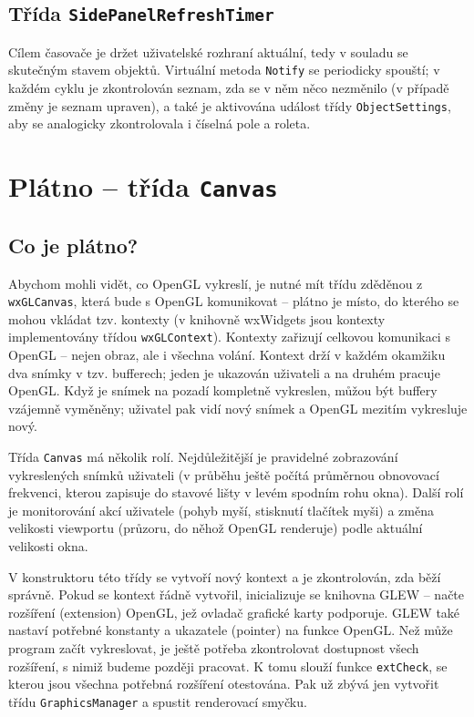 \documentclass[a4paper, 11pt]{report}
\begin{document}
\subsection{Třída \texttt{SidePanelRefreshTimer}}
Cílem časovače je držet uživatelské rozhraní aktuální, tedy v souladu se skutečným stavem objektů. Virtuální metoda \texttt{Notify} se periodicky spouští; v každém cyklu je zkontrolován seznam, zda se v něm něco nezměnilo (v případě změny je seznam upraven), a také je aktivována událost třídy \texttt{ObjectSettings}, aby se analogicky zkontrolovala i číselná pole a roleta.

\section{Plátno -- třída \texttt{Canvas}}
\subsection{Co je plátno?}
Abychom mohli vidět, co OpenGL vykreslí, je nutné mít třídu zděděnou z \texttt{wxGLCanvas}, která bude s OpenGL komunikovat -- plátno je místo, do kterého se mohou vkládat tzv. kontexty (v knihovně wxWidgets jsou kontexty implementovány třídou \texttt{wxGLContext}). Kontexty zařizují celkovou komunikaci s OpenGL -- nejen obraz, ale i všechna volání. Kontext drží v každém okamžiku dva snímky v tzv. bufferech; jeden je ukazován uživateli a na druhém pracuje OpenGL. Když je snímek na pozadí kompletně vykreslen, můžou být buffery vzájemně vyměněny; uživatel pak vidí nový snímek a OpenGL mezitím vykresluje nový.

Třída \texttt{Canvas} má několik rolí. Nejdůležitější je pravidelné zobrazování vykreslených snímků uživateli (v průběhu ještě počítá průměrnou obnovovací frekvenci, kterou zapisuje do stavové lišty v levém spodním rohu okna). Další rolí je monitorování akcí uživatele (pohyb myší, stisknutí tlačítek myši) a změna velikosti viewportu (průzoru, do něhož OpenGL renderuje) podle aktuální velikosti okna.

V konstruktoru této třídy se vytvoří nový kontext a je zkontrolován, zda běží správně. Pokud se kontext řádně vytvořil, inicializuje se knihovna GLEW -- načte rozšíření (extension) OpenGL, jež ovladač grafické karty podporuje. GLEW také nastaví potřebné konstanty a ukazatele (pointer) na funkce OpenGL. Než může program začít vykreslovat, je ještě potřeba zkontrolovat dostupnost všech rozšíření, s nimiž budeme později pracovat. K tomu slouží funkce \texttt{extCheck}, se kterou jsou všechna potřebná rozšíření otestována. Pak už zbývá jen vytvořit třídu \texttt{GraphicsManager} a spustit renderovací smyčku.
\end{document}
